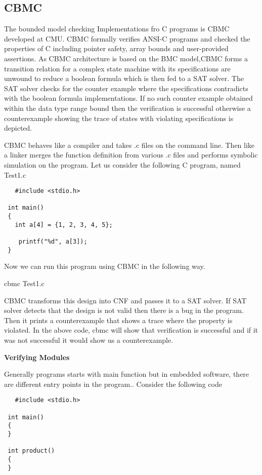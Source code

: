  \subsection{CBMC}
 
 The bounded model checking Implementations fro C programs is CBMC developed 
 at CMU. CBMC formally verifies ANSI-C programs and checked the properties of 
 C including pointer safety, array bounds and user-provided assertions. As CBMC 
 architecture is based on the BMC model,CBMC forms a transition relation for a
 complex state  machine  with its specifications are unwound to reduce a boolean
 formula which is then fed to a SAT solver. The SAT solver checks for the counter
 example where the specifications contradicts with the boolean formula 
 implementations. If no such counter example obtained within the data type range 
 bound then the  verification  is successful otherwise a counterexample showing 
 the trace of  states with violating specifications is depicted.
 
 
 CBMC behaves like a compiler and takes .c files on the command line. Then like a 
 linker merges the function definition from various .c files and performs symbolic 
 simulation on the program.
 Let us consider the following C program, named Test1.c
 \begin{verbatim}
   #include <stdio.h>
 
 int main()
 {
   int a[4] = {1, 2, 3, 4, 5};
   
    printf("%d", a[3]);
 }
 \end{verbatim}

Now we can run this program using CBMC in the following way.

cbmc Test1.c

CBMC transforms this design into CNF and passes it to a SAT solver.
If SAT solver detects that the design is not valid then there is a bug in the 
program. Then it prints a counterexample that shows a trace where the property 
is violated. In the above code, cbmc will show that verification is successful
 and if it was not successful it would show us a counterexample.
 
 \textbf{Verifying Modules}
 
 Generally programs starts with main function but in embedded software, there are
 different entry points in the program.. Consider the following code
  \begin{verbatim}
   #include <stdio.h>
 
 int main()
 {   
 }
 
 int product()
 {
 }
 \end{verbatim}
 
